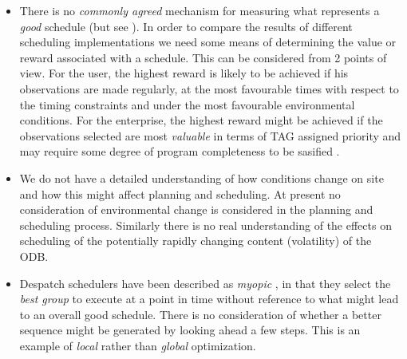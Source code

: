 \begin{itemize}


\item There is no \emph{commonly agreed} mechanism for measuring what represents a \emph{good} schedule (but see \citep{steele97control}). In order to compare the results of different scheduling implementations we need some means of determining the value or reward associated with a schedule. This can be considered from 2 points of view. For the user, the highest reward is likely to be achieved if his observations are made regularly, at the most favourable times with respect to the timing constraints and under the most favourable environmental conditions. For the enterprise, the highest reward might be achieved if the observations selected are most \emph{valuable} in terms of TAG assigned priority and may require some degree of program completeness to be sasified .

\item We do not have a detailed understanding of how conditions change on site and how this might affect planning and scheduling. At present no consideration of environmental change is considered in the planning and scheduling process. Similarly there is no real understanding of the effects on scheduling of the potentially rapidly changing content (volatility) of the ODB.

\item Despatch schedulers have been described as \emph{myopic} \citep{cicirello01random}, in that they select the \emph{best group} to execute at a point in time without reference to what might lead to an overall good schedule. There is no consideration of whether a better sequence might be generated by looking ahead a few steps. This is an example of \emph{local} rather than \emph{global} optimization.


\end{itemize}

